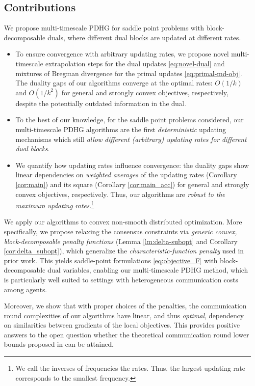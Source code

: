 \documentclass[10pt]{article}
\begin{document}
\subsection{Contributions}
We propose multi-timescale PDHG for saddle point problems with block-decomposable duals, where different dual blocks are updated at different rates. 
\begin{itemize}
    \item To ensure convergence with arbitrary updating rates, we propose novel multi-timescale extrapolation steps for the dual updates \eqref{eq:novel-dual} and mixtures of Bregman divergence for the primal updates \eqref{eq:primal-md-obj}. The duality gaps of our algorithms converge at the optimal rates: $O(1/k)$ and $O(1/k^2)$ for general and strongly convex objectives, respectively, despite the potentially outdated information in the dual. 
    \item To the best of our knowledge, for the saddle point problems considered, our multi-timescale PDHG algorithms are the first \textit{deterministic} updating mechanisms which still \textit{allow different (arbitrary) updating rates for different dual blocks}.
    \item We quantify how updating rates influence convergence: the duality gaps show linear dependencies on \textit{weighted averages} of the updating rates (Corollary \ref{cor:main}) and its square (Corollary \ref{cor:main_acc}) for general and strongly convex objectives, respectively. Thus, our algorithms are \textit{robust to the maximum updating rates}.\footnote{We call the inverses of frequencies the rates. Thus, the largest updating rate corresponds to the smallest frequency.}
\end{itemize}

We apply our algorithms to convex non-smooth distributed optimization. More specifically, we propose relaxing the consensus constraints via \textit{generic convex, block-decomposable penalty functions} (Lemma \ref{lm:delta-subopt} and Corollary \ref{cor:delta_subopt}), which generalize the \textit{characteristic-function penalty} used in prior work. This yields saddle-point formulations \eqref{eq:objective_F} with block-decomposable dual variables, enabling our multi-timescale PDHG method, which is particularly well suited to settings with heterogeneous communication costs among agents. 

Moreover, we show that with proper choices of the penalties, the communication round complexities of our algorithms have linear, and thus
\textit{optimal}, dependency on similarities between gradients of the local objectives. This provides positive answers to the open question whether the theoretical communication round lower bounds proposed in \cite{ArjevaniShamir2015Communication} can be attained. 
\end{document}

